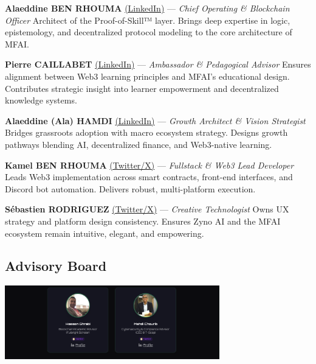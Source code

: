 \vspace{0.3cm}

\noindent\textbf{Alaeddine BEN RHOUMA} \href{https://www.linkedin.com/in/alaeddine-ben-rhouma/}{\textcolor{solana-purple}{(LinkedIn)}} — \textit{Chief Operating \& Blockchain Officer}  
Architect of the Proof-of-Skill™ layer. Brings deep expertise in logic, epistemology, and decentralized protocol modeling to the core architecture of MFAI.

\noindent\textbf{Pierre CAILLABET} \href{https://www.linkedin.com/in/pierre-caillabet-7068293/}{\textcolor{solana-purple}{(LinkedIn)}} — \textit{Ambassador \& Pedagogical Advisor}  
Ensures alignment between Web3 learning principles and MFAI's educational design. Contributes strategic insight into learner empowerment and decentralized knowledge systems.

\noindent\textbf{Alaeddine (Ala) HAMDI} \href{https://www.linkedin.com/in/alaeddine-hamdi-59180813a/}{\textcolor{solana-purple}{(LinkedIn)}} — \textit{Growth Architect \& Vision Strategist}  
Bridges grassroots adoption with macro ecosystem strategy. Designs growth pathways blending AI, decentralized finance, and Web3-native learning.

\noindent\textbf{Kamel BEN RHOUMA} \href{https://x.com/TreizeB__}{\textcolor{solana-purple}{(Twitter/X)}} — \textit{Fullstack \& Web3 Lead Developer}  
Leads Web3 implementation across smart contracts, front-end interfaces, and Discord bot automation. Delivers robust, multi-platform execution.

\noindent\textbf{Sébastien RODRIGUEZ} \href{https://x.com/R_Sebastien_13}{\textcolor{solana-purple}{(Twitter/X)}} — \textit{Creative Technologist}  
Owns UX strategy and platform design consistency. Ensures Zyno AI and the MFAI ecosystem remain intuitive, elegant, and empowering.

\vspace{0.5cm}
\subsection*{Advisory Board}

\begin{center}
  \includegraphics[width=0.7\textwidth]{images/advisors.png}
\end{center}

